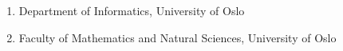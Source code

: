 \begin{enumerate}
\item
 Department of Informatics, University of Oslo\\
\item
 Faculty of Mathematics and Natural Sciences, University of Oslo\\
\end{enumerate}